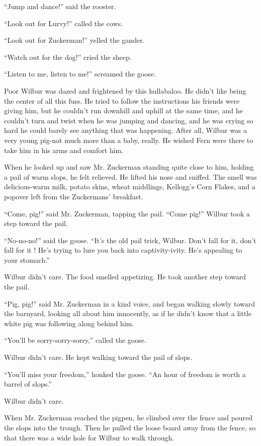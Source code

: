 \documentclass[a4paper, oneside]{book}
\begin{document}
 ``Jump and dance!'' said the rooster.
 
 ``Look out for Lurvy!'' called the cows.
 
 ``Look out for Zuckerman!'' yelled the gander.
 
 ``Watch out for the dog!'' cried the sheep.
 
 ``Listen to me, listen to me!'' screamed the goose. 
 
 Poor Wilbur was dazed and frightened by this hullabaloo. He
didn't like being the center of all this fuss. He tried to follow the
instructions his friends were giving him, but he couldn't run
downhill and uphill at the same time, and he couldn't turn and 
twist when he was jumping and dancing, and he was crying so hard
he could barely see anything that was happening. After all, Wilbur
was a very young pig-not much more than a baby, really. He
wished Fern were there to take him in his arms and comfort him.

When he looked up and saw Mr. Zuckerman standing quite close to
him, holding a pail of warm slops, he felt relieved. He lifted his
nose and sniffed. The smell was delicious-warm milk, potato skins,
wheat middlings, Kellogg's Corn Flakes, and a popover left from
the Zuckermans' breakfast. 
 
 ``Come, pig!'' said Mr. Zuckerman, tapping the pail. ``Come pig!''
 Wilbur took a step toward the pail.
 
 ``No-no-no!'' said the goose. ``It's the old pail trick, Wilbur. Don't
fall for it, don't fall for it ! He's trying to lure you back into
captivity-ivity. He's appealing to your stomach.''

 Wilbur didn't care. The food smelled appetizing. He took another
step toward the pail.

 ``Pig, pig!'' said Mr. Zuckerman in a kind voice, and began walking
slowly toward the barnyard, looking all about him innocently, as if
he didn't know that a little white pig was following along behind
him.

 ``You'll be sorry-sorry-sorry,'' called the goose. 
 
Wilbur didn't care. He kept walking toward the pail of slops. 

 ``You'll miss your freedom,'' honked the goose. ``An hour of
freedom is worth a barrel of slops.''

 Wilbur didn't care.
 
 When Mr. Zuckerman reached the pigpen, he climbed over the
fence and poured the slops into the trough. Then he pulled the
loose board away from the fence, so that there was a wide hole for
Wilbur to walk through.
\end{document}
